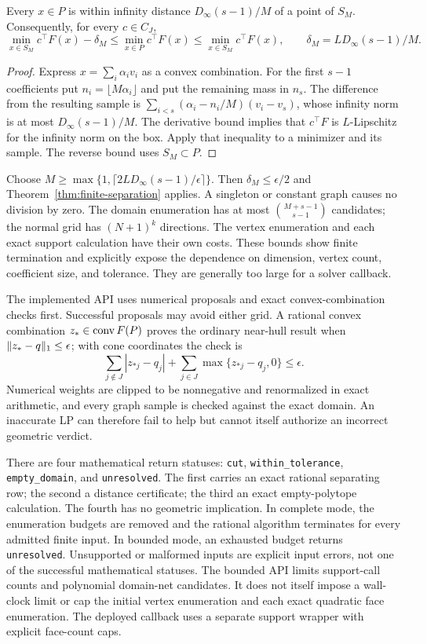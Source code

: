 \begin{lemma}\label{lem:domain-net}
Every $x\in P$ is within infinity distance
$D_\infty(s-1)/M$ of a point of $S_M$. Consequently, for every
$c\in C_J$,
\[
\min_{x\in S_M}c^\top F(x)-\delta_M
\le\min_{x\in P}c^\top F(x)
\le\min_{x\in S_M}c^\top F(x),
\qquad \delta_M=LD_\infty(s-1)/M.
\]
\end{lemma}
\begin{proof}
Express $x=\sum_i\alpha_iv_i$ as a convex combination. For the first
$s-1$ coefficients put $n_i=\lfloor M\alpha_i\rfloor$ and put
the remaining mass in $n_s$. The difference from the resulting sample
is $\sum_{i<s}(\alpha_i-n_i/M)(v_i-v_s)$, whose infinity norm is
at most $D_\infty(s-1)/M$. The derivative bound implies that
$c^\top F$ is $L$-Lipschitz for the infinity norm on the box.
Apply that inequality to a minimizer and its sample. The reverse bound
uses $S_M\subset P$.
\end{proof}

Choose $M\ge\max\{1,\lceil2LD_\infty(s-1)/\epsilon\rceil\}$.
Then $\delta_M\le\epsilon/2$ and Theorem~\ref{thm:finite-separation}
applies. A singleton or constant graph causes no division by zero.
The domain enumeration has at most $\binom{M+s-1}{s-1}$ candidates;
the normal grid has $(N+1)^k$ directions. The vertex enumeration and
each exact support calculation have their own costs. These bounds show
finite termination and explicitly expose the dependence on dimension,
vertex count, coefficient size, and tolerance. They are generally too
large for a solver callback.

The implemented API
uses numerical proposals and exact convex-combination checks first.
Successful proposals may avoid either grid. A rational convex combination
$z_*\in\operatorname{conv} F(P)$ proves the ordinary near-hull result when
$\lVert z_*-q\rVert_1\le\epsilon$; with cone coordinates the check is
\[
\sum_{j\notin J}|z_{*j}-q_j|+
\sum_{j\in J}\max\{z_{*j}-q_j,0\}\le\epsilon.
\]
Numerical weights are clipped to be nonnegative and renormalized in
exact arithmetic, and every graph sample is checked against the exact
domain. An inaccurate LP can therefore fail to help but cannot itself
authorize an incorrect geometric verdict.

There are four mathematical return statuses: \texttt{cut},
\texttt{within\_tolerance}, \texttt{empty\_domain}, and
\texttt{unresolved}. The first carries an exact rational separating row;
the second a distance certificate; the third an exact empty-polytope
calculation. The fourth has no geometric implication. In complete mode,
the enumeration budgets are removed and the rational algorithm terminates
for every admitted finite input. In bounded mode, an exhausted budget
returns \texttt{unresolved}. Unsupported or malformed inputs are explicit
input errors, not one of the successful mathematical statuses.
The bounded API limits support-call counts and polynomial domain-net
candidates. It does not itself impose a wall-clock limit or cap the
initial vertex enumeration and each exact quadratic face enumeration.
The deployed callback uses a separate support wrapper with explicit
face-count caps.

